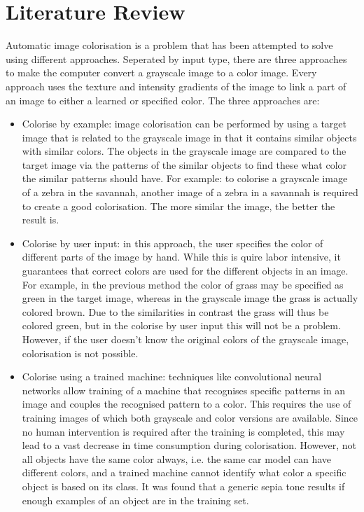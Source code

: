 \section{Literature Review}
Automatic image colorisation is a problem that has been attempted to solve using different approaches. Seperated by input type, there are three approaches to make the computer convert a grayscale image to a color image. Every approach uses the texture and intensity gradients of the image to link a part of an image to either a learned or specified color. The three approaches are:


\begin{itemize}
	\item Colorise by example: image colorisation can be performed by using a target image that is related to the grayscale image in that it contains similar objects with similar colors. The objects in the grayscale image are compared to the target image via the patterns of the similar objects to find these what color the similar patterns should have. For example: to colorise a grayscale image of a zebra in the savannah, another image of a zebra in a savannah is required to create a good colorisation. The more similar the image, the better the result is.
	
	\item Colorise by user input: in this approach, the user specifies the color of different parts of the image by hand. While this is quire labor intensive, it guarantees that correct colors are used for the different objects in an image. For example, in the previous method the color of grass may be specified as green in the target image, whereas in the grayscale image the grass is actually colored brown. Due to the similarities in contrast the grass will thus be colored green, but in the colorise by user input this will not be a problem. However, if the user doesn't know the original colors of the grayscale image, colorisation is not possible.
	
	\item Colorise using a trained machine: techniques like convolutional neural networks allow training of a machine that recognises specific patterns in an image and couples the recognised pattern to a color. This requires the use of training images of which both grayscale and color versions are available. Since no human intervention is required after the training is completed, this may lead to a vast decrease in time consumption during colorisation. However, not all objects have the same color always, i.e. the same car model can have different colors, and a trained machine cannot identify what color a specific object is based on its class. It was found that a generic sepia tone results if enough examples of an object are in the training set.

\end{itemize}










